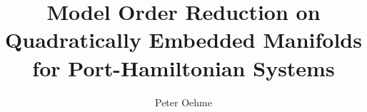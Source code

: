 

\author{Peter Oehme}
\title{Model Order Reduction on Quadratically Embedded Manifolds for Port-Hamiltonian Systems}


    \maketitle

    
    
    
    

    \printbibliography[
        heading=bibintoc,
        title={Bibliography}
    ]
